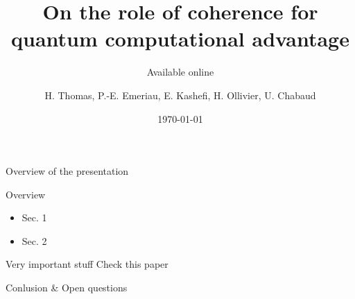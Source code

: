 \documentclass[aspectratio=169, 9pt]{beamer}
\title[Short coherence title]{On the role of coherence for quantum computational advantage}
\subtitle{Available online}
\date{\today}
\author{H. Thomas, P.-E. Emeriau, E. Kashefi, H. Ollivier, U. Chabaud}
\begin{document}
\begin{frame}
    \titlepage
\end{frame}

\begin{frame}{Overview of the presentation}
    \begin{block}{Overview}
        \begin{itemize}\itemsep 2em
            \item Sec. 1
            \item Sec. 2
        \end{itemize}
    \end{block}

    \begin{alertblock}{Very important stuff}
        Check this paper \cite{thomas2024role}
    \end{alertblock}

\end{frame}


\begin{frame}{Conlusion \& Open questions}
    
    
\end{frame}
\end{document}
